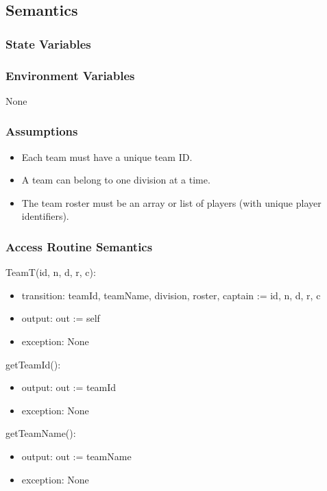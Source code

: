 \documentclass[12pt, titlepage]{article}
\begin{document}
\subsection{Semantics}

\subsubsection{State Variables}

\subsubsection{Environment Variables}
None

\subsubsection{Assumptions}
\begin{itemize}
  \item Each team must have a unique team ID.
  \item A team can belong to one division at a time.
  \item The team roster must be an array or list of players (with unique player identifiers).
\end{itemize}

\subsubsection{Access Routine Semantics}

\noindent TeamT(id, n, d, r, c):
\begin{itemize}
  \item transition: teamId, teamName, division, roster, captain := id, n, d, r, c
  \item output: out := self
  \item exception: None
\end{itemize}

\noindent getTeamId():
\begin{itemize}
  \item output: out := teamId
  \item exception: None
\end{itemize}

\noindent getTeamName():
\begin{itemize}
  \item output: out := teamName
  \item exception: None
\end{itemize}
\end{document}
